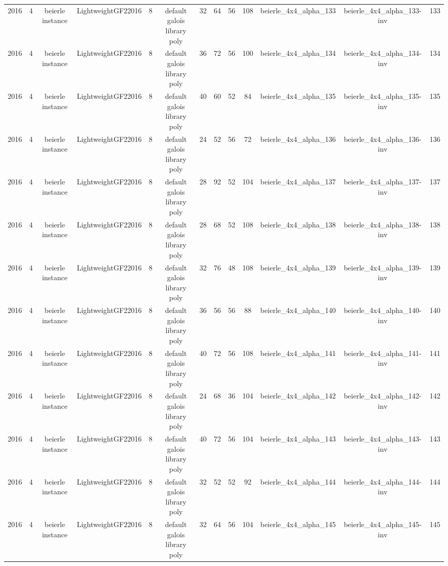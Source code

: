 \begin{tabular}{c c c c c c c c c c c c c}
2016 & 4 & beierle instance & LightweightGF22016 & 8 & default galois library poly & 32 & 64 & 56 & 108 & beierle_4x4_alpha_133 & beierle_4x4_alpha_133-inv & 133 \\
2016 & 4 & beierle instance & LightweightGF22016 & 8 & default galois library poly & 36 & 72 & 56 & 100 & beierle_4x4_alpha_134 & beierle_4x4_alpha_134-inv & 134 \\
2016 & 4 & beierle instance & LightweightGF22016 & 8 & default galois library poly & 40 & 60 & 52 & 84 & beierle_4x4_alpha_135 & beierle_4x4_alpha_135-inv & 135 \\
2016 & 4 & beierle instance & LightweightGF22016 & 8 & default galois library poly & 24 & 52 & 56 & 72 & beierle_4x4_alpha_136 & beierle_4x4_alpha_136-inv & 136 \\
2016 & 4 & beierle instance & LightweightGF22016 & 8 & default galois library poly & 28 & 92 & 52 & 104 & beierle_4x4_alpha_137 & beierle_4x4_alpha_137-inv & 137 \\
2016 & 4 & beierle instance & LightweightGF22016 & 8 & default galois library poly & 28 & 68 & 52 & 108 & beierle_4x4_alpha_138 & beierle_4x4_alpha_138-inv & 138 \\
2016 & 4 & beierle instance & LightweightGF22016 & 8 & default galois library poly & 32 & 76 & 48 & 108 & beierle_4x4_alpha_139 & beierle_4x4_alpha_139-inv & 139 \\
2016 & 4 & beierle instance & LightweightGF22016 & 8 & default galois library poly & 36 & 56 & 56 & 88 & beierle_4x4_alpha_140 & beierle_4x4_alpha_140-inv & 140 \\
2016 & 4 & beierle instance & LightweightGF22016 & 8 & default galois library poly & 40 & 72 & 56 & 108 & beierle_4x4_alpha_141 & beierle_4x4_alpha_141-inv & 141 \\
2016 & 4 & beierle instance & LightweightGF22016 & 8 & default galois library poly & 24 & 68 & 36 & 104 & beierle_4x4_alpha_142 & beierle_4x4_alpha_142-inv & 142 \\
2016 & 4 & beierle instance & LightweightGF22016 & 8 & default galois library poly & 40 & 72 & 56 & 104 & beierle_4x4_alpha_143 & beierle_4x4_alpha_143-inv & 143 \\
2016 & 4 & beierle instance & LightweightGF22016 & 8 & default galois library poly & 32 & 52 & 52 & 92 & beierle_4x4_alpha_144 & beierle_4x4_alpha_144-inv & 144 \\
2016 & 4 & beierle instance & LightweightGF22016 & 8 & default galois library poly & 32 & 64 & 56 & 104 & beierle_4x4_alpha_145 & beierle_4x4_alpha_145-inv & 145 \\

\end{tabular}
